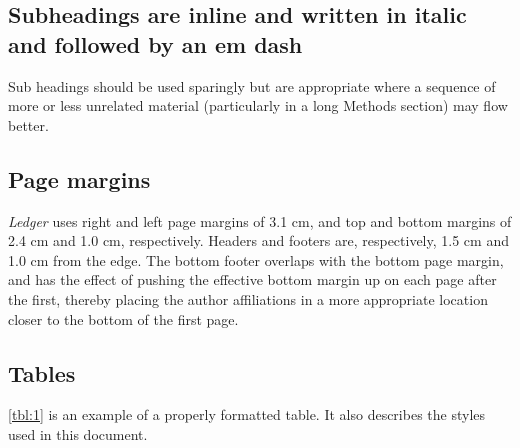 \documentclass{ledger}
\begin{document}
\subsection{Subheadings are inline and written in italic and followed by an em dash}

Sub headings should be used sparingly but are appropriate where a sequence of more or less unrelated material (particularly in a long Methods section) may flow better.

\subsection{Page margins}

\emph{Ledger} uses right and left page margins of 3.1 cm, and top and bottom margins of 2.4 cm and 1.0 cm, respectively.  Headers and footers are, respectively, 1.5 cm and 1.0 cm from the edge.  The bottom footer overlaps with the bottom page margin, and has the effect of pushing the effective bottom margin up on each page after the first, thereby placing the author affiliations in a more appropriate location closer to the bottom of the first page.

\subsection{Tables}

\cref{tbl:1} is an example of a properly formatted table.  It also describes the styles used in this document.
\end{document}
